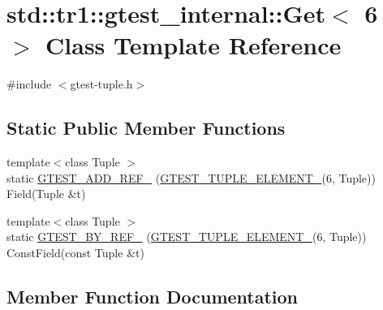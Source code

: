 \hypertarget{classstd_1_1tr1_1_1gtest__internal_1_1Get_3_016_01_4}{}\section{std\+:\+:tr1\+:\+:gtest\+\_\+internal\+:\+:Get$<$ 6 $>$ Class Template Reference}
\label{classstd_1_1tr1_1_1gtest__internal_1_1Get_3_016_01_4}


{\ttfamily \#include $<$gtest-\/tuple.\+h$>$}

\subsection*{Static Public Member Functions}
\begin{DoxyCompactItemize}
\item 
{\footnotesize template$<$class Tuple $>$ }\\static \hyperlink{classstd_1_1tr1_1_1gtest__internal_1_1Get_3_016_01_4_a28034152d066c8644fa55e9fc0e3a12d}{G\+T\+E\+S\+T\+\_\+\+A\+D\+D\+\_\+\+R\+E\+F\+\_\+} (\hyperlink{gtest-tuple_8h_a1b7f133d8aa02e0b7afed7b66781eeb7}{G\+T\+E\+S\+T\+\_\+\+T\+U\+P\+L\+E\+\_\+\+E\+L\+E\+M\+E\+N\+T\+\_\+}(6, Tuple)) Field(Tuple \&t)
\item 
{\footnotesize template$<$class Tuple $>$ }\\static \hyperlink{classstd_1_1tr1_1_1gtest__internal_1_1Get_3_016_01_4_a6e396b998757e0ab9b75db0c68a7c360}{G\+T\+E\+S\+T\+\_\+\+B\+Y\+\_\+\+R\+E\+F\+\_\+} (\hyperlink{gtest-tuple_8h_a1b7f133d8aa02e0b7afed7b66781eeb7}{G\+T\+E\+S\+T\+\_\+\+T\+U\+P\+L\+E\+\_\+\+E\+L\+E\+M\+E\+N\+T\+\_\+}(6, Tuple)) Const\+Field(const Tuple \&t)
\end{DoxyCompactItemize}


\subsection{Member Function Documentation}
